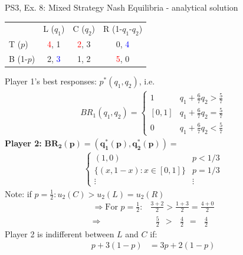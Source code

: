 \begin{frame}{PS3, Ex. 8: Mixed Strategy Nash Equilibria - analytical solution}
  \begin{multicols}{2}
    \begin{table}
      \begin{tabular}{l|c|c|c|}
          \multicolumn{1}{c}{}  & \multicolumn{1}{c}{L ($q_1$)} & \multicolumn{1}{c}{C ($q_2$)} & \multicolumn{1}{c}{R (1-$q_1$-$q_2$)} \\\cline{2-4}
          T ($p$)   & \textcolor{red}{4}, 1 & \textcolor{red}{2}, 3 & 0, \textcolor{blue}{4} \\\cline{2-4}
          B (1-$p$) & 2, \textcolor{blue}{3} & 1, 2 & \textcolor{red}{5}, 0 \\\cline{2-4}
      \end{tabular}
    \end{table}
    Player 1's best responses: $p^{*}(q_1,q_2)$, i.e.
    \begin{align*}
      BR_1(q_1,q_2)=
      \left\{ \begin{array}{ll}
          1                 & q_1 + \frac{6}{7}q_2 > \frac{5}{7}\\
          \left[0,1\right]  & q_1 + \frac{6}{7}q_2 = \frac{5}{7}\\
          0                 & q_1 + \frac{6}{7}q_2 < \frac{5}{7}
      \end{array}\right.
    \end{align*}
    \textbf{Player 2:} $\bm{BR_2(p)=\left(q_1^{*}(p),q_2^{*}(p)\right)}=$
    \begin{align*}
      \left\{ \begin{array}{ll}
          (1,0)                 & p < 1/3 \\
          \{(x,1-x):x\in[0,1]\} & p = 1/3 \\
          \vdots                & \vdots
      \end{array}\right.
    \end{align*}
    Note: if $p=\frac{1}{2}:u_2(C)>u_2(L)=u_2(R)$
    \begin{align*}
      \Rightarrow\text{For }p=\frac{1}{2}:&\frac{3+2}{2}>\frac{1+3}{2}=\frac{4+0}{2}\\
          \Rightarrow&\ \ \ \frac{5}{2}\ \ >\ \ \ \frac{4}{2}\ \ =\ \ \ \frac{4}{2}
    \end{align*}
  \vfill\null \columnbreak
    Player 2 is indifferent between $L$ and $C$ if:
    \begin{align*}
      p+3(1-p)&= 3p + 2(1-p) \\

\end{align*}
\end{multicols}
\end{frame}
